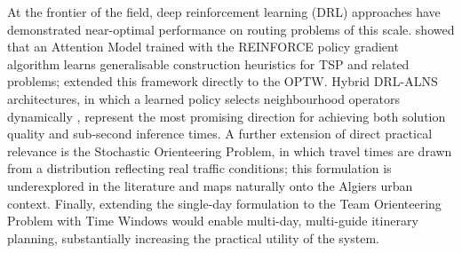 At the frontier of the field, deep reinforcement learning (DRL)
approaches have demonstrated near-optimal performance on routing
problems of this scale. \textcite{Kool2019} showed that an
Attention Model trained with the REINFORCE policy gradient
algorithm learns generalisable construction heuristics for TSP and
related problems; \textcite{Gama2020} extended this framework
directly to the OPTW. Hybrid DRL-ALNS architectures, in which a
learned policy selects neighbourhood operators dynamically
\parencite{Reijnen2024}, represent the most promising direction
for achieving both solution quality and sub-second inference
times. A further extension of direct practical relevance is the
Stochastic Orienteering Problem, in which travel times are drawn
from a distribution reflecting real traffic conditions; this
formulation is underexplored in the literature
\parencite{Vansteenwegen2011} and maps naturally onto the
Algiers urban context. Finally, extending the single-day
formulation to the Team Orienteering Problem with Time Windows
\parencite{Gunawan2016} would enable multi-day, multi-guide
itinerary planning, substantially increasing the practical utility
of the system.
